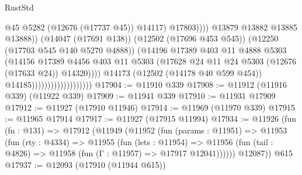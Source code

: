 \begin{lexlean}{RustStd}
\begin{coremodule}
                                                          @45
                                                          @5282
                                                          (@12676 (@17737 @45))
                                                          @14117)
                                                        @17803))))
                                                @13879
                                                @13882
                                                @13885
                                                @13888))
                                            (@14047 (@17691 @138))
                                            (@12502 (@17696 @453 @545))
                                            (@12250 (@17703 @545 @140 @5270 @4888))
                                            (@14196
                                              @17389
                                              @403
                                              @11
                                              @4888
                                              @5303
                                              (@14156
                                                @17389
                                                @4456
                                                @403
                                                @11
                                                @5303
                                                (@17628
                                                  @24
                                                  @11
                                                  @24
                                                  @5303
                                                  (@12676 (@17633 @24))
                                                  @14320))))
                                          @14173
                                          (@12502 (@14178 @40 @599 @454))
                                          @14185)))))))))))))))))))
@17904 := @11910 @339
@17908 := @11912 (@11916 @339) (@11922 @339)
@17909 := @11941 @339
@17910 := @11931 @17909
@17912 := @11927 (@17910 @11946)
@17914 := @11969 (@11970 @339)
@17915 := @11965 @17914
@17917 := @11927 (@17915 @11994)
@17934 := @11926
    (fun (fn : @131) =>
    @17912
      (@11949
        (@11952
          (fun (params : @11951) =>
          @11953
            (fun (rty : @4334) =>
            @11955
              (fun (lets : @11954) =>
              @11956 (fun (tail : @4826) => @11958 (fun (Γ : @11957) => @17917 @12041))))))
        @12087))
    @615
@17937 := @12093 (@17910 (@11944 @615))

\end{coremodule}
\end{lexlean}

